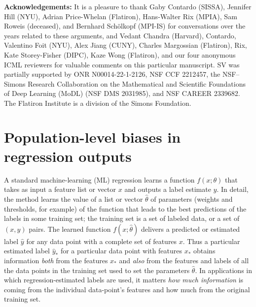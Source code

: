 \documentclass{article}
\renewcommand{\paragraph}[1]{\noindent\par\textbf{#1}}
\begin{document}
\paragraph{Acknowledgements:}
It is a pleasure to thank
  Gaby Contardo (SISSA),
  Jennifer Hill (NYU),
  Adrian Price-Whelan (Flatiron),
  Hans-Walter Rix (MPIA),
  Sam Roweis (deceased), and
  Bernhard Sch\"olkopf (MPI-IS)
for conversations over the years related to these arguments, and
  Vedant Chandra (Harvard),
  Contardo,
  Valentino Foit (NYU),
  Alex Jiang (CUNY),
  Charles Margossian (Flatiron),
  Rix,
  Kate Storey-Fisher (DIPC),
  Kaze Wong (Flatiron), and
  our four anonymous ICML reviewers
for valuable comments on this particular manuscript.
SV was partially supported by ONR N00014-22-1-2126, NSF CCF 2212457, the NSF–Simons Research Collaboration
on the Mathematical and Scientific Foundations of Deep Learning (MoDL) (NSF DMS 2031985), and NSF
CAREER 2339682.
The Flatiron Institute is a division of the Simons Foundation.




\clearpage\appendix
\section{Population-level biases in regression outputs}\label{app:toy}
A standard machine-learning (ML) regression learns a function $f(x;\theta)$ that takes as input a feature list or vector $x$ and outputs a label estimate $y$.
In detail, the method learns the value of a list or vector $\hat{\theta}$ of parameters (weights and thresholds, for example) of the function that leads to the best predictions of the labels in some training set; the training set is a set of labeled data, or a set of $(x, y)$ pairs.
The learned function $f(x;\hat{\theta})$ delivers a predicted or estimated label $\hat{y}$ for any data point with a complete set of features $x$.
Thus a particular estimated label $\hat{y}_\ast$ for a particular data point with features $x_\ast$ obtains information \emph{both} from the features $x_\ast$ and \emph{also} from the features and labels of all the data points in the training set used to set the parameters $\hat{\theta}$.
In applications in which regression-estimated labels are used, it matters \emph{how much information} is coming from the individual data-point's features and how much from the original training set.
\end{document}
